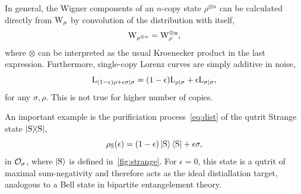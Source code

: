 \documentclass[pra,
aps,
twocolumn,
superscriptaddress,
groupedaddress,
nofootinbib,
reprint
]{revtex4-1}
\begin{document}

In general, the Wigner components of an $n$-copy state $\rho^{\otimes n}$ can be calculated directly from $\W{\rho}$ by convolution of the distribution with itself,
\begin{equation}
	\W{\rho^{\otimes n}} = \rm{W}_{\rho}^{\otimes n},
\end{equation}
where $\otimes$ can be interpreted as the usual Kroenecker product in the last expression.
Furthermore, single-copy Lorenz curves are simply additive in noise, 
\begin{equation}
{{\rm{L}}_{(1-\epsilon)\rho + \epsilon\sigma|\sigma}} = (1-\epsilon){{\rm{L}}_{\rho|\sigma}} + \epsilon{{\rm{L}}_{\sigma|\sigma}},
\end{equation}
for any $\sigma, \rho$.
This is not true for higher number of copies.

An important example is the purificiation process~\cref{eq:dist} of the qutrit Strange state $\ketbra{\rm{S}}$,
\begin{equation}
    \rho_{\rm{S}}(\epsilon) = (1 - \epsilon) \ket{\rm{S}}\bra{\rm{S}} + \epsilon \sigma,
\end{equation}
in $\mathcal{O}_\sigma$, where $\ket{\rm{S}}$ is defined in~\cref{fig:strange}. 
For $\epsilon=0$, this state is a qutrit of maximal sum-negativity  and therefore acts as the ideal distiallation target, analogous to a Bell state in bipartite entangelement theory.
\end{document}
